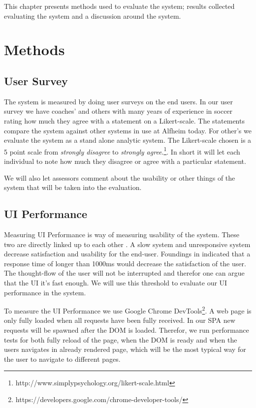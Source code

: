 This chapter presents methods used to evaluate the system; results collected evaluating the system and a discussion around the system. 

\section{Methods}
\subsection{User Survey}

The system is measured by doing user surveys on the end users. In our user survey we have coaches’ and others with many years of experience in soccer rating how much they agree with a statement on a Likert-scale. The statements compare the system against other systems in use at Alfheim today. For other’s we evaluate the system as a stand alone analytic system. The Likert-scale chosen is a 5 point scale from \textit{strongly disagree} to \textit{strongly agree}.\footnote{http://www.simplypsychology.org/likert-scale.html}. In short it will let each individual to note how much they disagree or agree with a particular statement.

We will also let assessors comment about the usability or other things of the system that will be taken into the evaluation. 

\subsection{UI Performance}

Measuring \ac{UI} Performance is way of measuring usability of the system. These two are directly linked up to each other \cite{satisfaction}. A slow system and unresponsive system decrease satisfaction and usability for the end-user. Foundings in \cite{nielsen} indicated that a response time of longer than 1000ms would decrease the satisfaction of the user. The thought-flow of the user will not be interrupted and therefor one can argue that the \ac{UI} it's fast enough. We will use this threshold to evaluate our UI performance in the system. 

To measure the UI Performance we use Google Chrome DevTools\footnote{https://developers.google.com/chrome-developer-tools/}. A web page is only fully loaded when all requests have been fully received. In our \ac{SPA} new requests will be spawned after the \ac{DOM} is loaded. Therefor, we run performance tests for both fully reload of the page, when the DOM is ready and when the users navigates in already rendered page, which will be the most typical way for the user to navigate to different pages.

